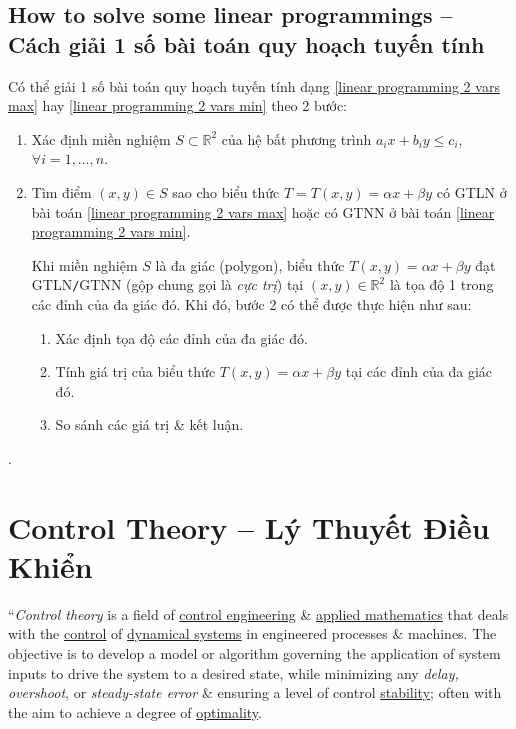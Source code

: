 \documentclass{article}
\begin{document}
\subsection{How to solve some linear programmings -- Cách giải 1 số bài toán quy hoạch tuyến tính}
Có thể giải 1 số bài toán quy hoạch tuyến tính dạng \eqref{linear programming 2 vars max} hay \eqref{linear programming 2 vars min} theo 2 bước:
\begin{enumerate}
	\item Xác định miền nghiệm $S\subset\mathbb{R}^2$ của hệ bất phương trình $a_ix + b_iy\le c_i$, $\forall i = 1,\ldots,n$.
	\item Tìm điểm $(x,y)\in S$ sao cho biểu thức $T = T(x,y) = \alpha x + \beta y$ có {\rm GTLN} ở bài toán \eqref{linear programming 2 vars max} hoặc có {\rm GTNN} ở bài toán \eqref{linear programming 2 vars min}.

	Khi miền nghiệm $S$ là đa giác (polygon), biểu thức $T(x,y) = \alpha x + \beta y$ đạt GTLN{\tt/}GTNN (gộp chung gọi là {\it cực trị}) tại $(x,y)\in\mathbb{R}^2$ là tọa độ 1 trong các đỉnh của đa giác đó. Khi đó, bước 2 có thể được thực hiện như sau:
	\begin{enumerate}
		\item Xác định tọa độ các đỉnh của đa giác đó.
		\item Tính giá trị của biểu thức $T(x,y) = \alpha x + \beta y$ tại các đỉnh của đa giác đó.
		\item So sánh các giá trị \& kết luận.
	\end{enumerate}
\end{enumerate}
\cite[Chuyên đề II, \S1, LT1--3, 1., 2., 3., 4., 5., pp. 20--25]{CDHT_Toan_12_Canh_Dieu}.


\section{Control Theory -- Lý Thuyết Điều Khiển}
``{\it Control theory} is a field of \href{https://en.wikipedia.org/wiki/Control_engineering}{control engineering} \& \href{https://en.wikipedia.org/wiki/Applied_mathematics}{applied mathematics} that deals with the \href{https://en.wikipedia.org/wiki/Control_system}{control} of \href{https://en.wikipedia.org/wiki/Dynamical_system}{dynamical systems} in engineered processes \& machines. The objective is to develop a model or algorithm governing the application of system inputs to drive the system to a desired state, while minimizing any {\it delay, overshoot}, or {\it steady-state error} \& ensuring a level of control \href{https://en.wikipedia.org/wiki/Stability_theory}{stability}; often with the aim to achieve a degree of \href{https://en.wikipedia.org/wiki/Optimal_control}{optimality}.
\end{document}
